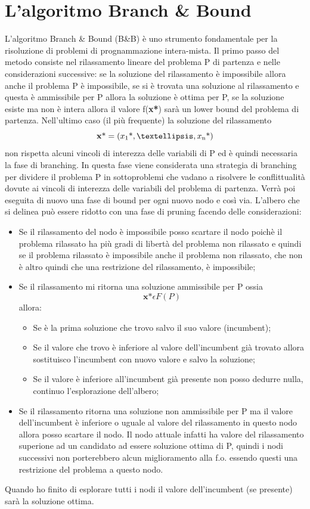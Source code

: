 \documentclass[12pt,a4paper,twoside,openright]{book}
\begin{document}
\section{L'algoritmo Branch \& Bound}
L'algoritmo Branch \& Bound (B\&B) è uno strumento fondamentale per la risoluzione di problemi di 
prognammazione intera-mista. Il primo passo del metodo consiste nel rilassamento lineare del problema P di partenza e nelle considerazioni
successive: se la soluzione del rilassamento è impossibile allora anche il problema P è impossibile, 
se si è trovata una soluzione al rilassamento e questa è ammissibile per P allora la 
soluzione è ottima per P, se la soluzione esiste ma non è intera allora il valore f(\textbf{x\textup{*}}) 
sarà un lower bound del problema di partenza.
Nell’ultimo caso (il più frequente) la soluzione del rilassamento \[\textbf{x}\textup{*} = 
(x \textsubscript{1} \textup{*}, …, x\textsubscript{n} \textup{*})\] non rispetta alcuni 
vincoli di interezza delle variabili di P ed è quindi necessaria la fase di branching.
In questa fase viene considerata una strategia di branching per dividere il problema P 
in sottoproblemi che vadano a risolvere le conflittualità dovute ai vincoli di interezza 
delle variabili del problema di partenza. Verrà poi eseguita di nuovo una 
fase di bound per ogni nuovo nodo e così via.
L’albero che si delinea può essere ridotto con una fase di pruning facendo delle 
considerazioni:
\begin{itemize}
    \item Se il rilassamento del nodo è impossibile posso scartare il nodo poichè
        il problema rilassato ha più gradi di libertà del problema non rilassato e
        quindi se il problema rilassato è impossibile anche il problema non rilassato, che
        non è altro quindi che una restrizione del rilassamento, è impossibile;
    \item Se il rilassamento mi ritorna una soluzione ammissibile per P ossia 
    \[\textbf{x*} \epsilon F(P)\] allora:
        \begin{itemize}
            \item Se è la prima soluzione che trovo salvo il suo valore (incumbent);
            \item Se il valore che trovo è inferiore al valore dell’incumbent già 
                trovato allora sostituisco l’incumbent con nuovo valore e salvo la 
                soluzione;
            \item Se il valore è inferiore all'incumbent già presente non posso dedurre nulla,
                continuo l'esplorazione dell'albero;
        \end{itemize}
    \item Se il rilassamento ritorna una soluzione non ammissibile per P ma il valore 
        dell’incumbent è inferiore o uguale al valore del rilassamento in questo nodo allora posso
        scartare il nodo. Il nodo attuale infatti ha valore del rilassamento superione ad un
        candidato ad essere soluzione ottima di P, quindi i nodi successivi non porterebbero 
        alcun miglioramento alla f.o. essendo questi una restrizione del problema a questo nodo. 
\end{itemize}
Quando ho finito di esplorare tutti i nodi il valore dell’incumbent (se presente) sarà la soluzione ottima.
\end{document}
